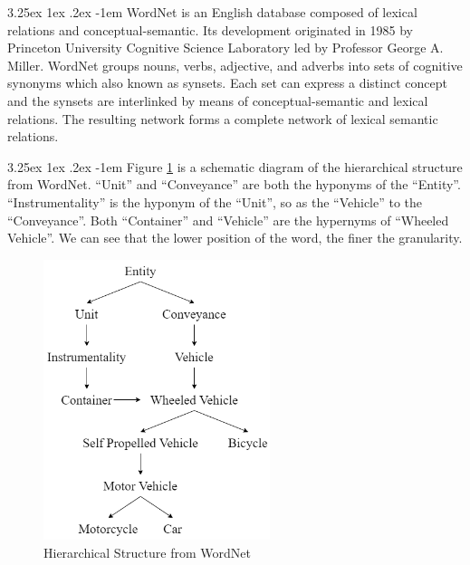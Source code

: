 \documentclass[12pt]{article}
\makeatletter
\renewcommand\paragraph{\@startsection{paragraph}{5}{\z@}%
  {3.25ex \@plus1ex \@minus.2ex}%
  {-1em}%
  {\normalfont\normalsize\bfseries}}
\makeatother
\begin{document}
\begin{CJK*}{UTF8}{bkai}
\begin{spacing}{1.77}
\paragraph{}
WordNet \cite{wordnet} is an English database composed of lexical relations and conceptual-semantic. Its development originated in 1985 by Princeton University Cognitive Science Laboratory led by Professor George A. Miller. WordNet groups nouns, verbs, adjective, and adverbs into sets of cognitive synonyms which also known as synsets. Each set can express a distinct concept and the synsets are interlinked by means of conceptual-semantic and lexical relations. The resulting network forms a complete network of lexical semantic relations.

\paragraph{}
Figure \ref{fig:wordnet} is a schematic diagram of the hierarchical structure from WordNet. ``Unit'' and ``Conveyance'' are both the hyponyms of the ``Entity''. ``Instrumentality'' is the hyponym of the ``Unit'', so as the ``Vehicle'' to the ``Conveyance''. Both ``Container'' and ``Vehicle'' are the hypernyms of ``Wheeled Vehicle''. We can see that the lower position of the word, the finer the granularity.

\begin{figure}[H]
  \centering
  \includegraphics[width=250px]{WordNet.png}
  \caption{Hierarchical Structure from WordNet}
  \label{fig:wordnet}
\end{figure}


\end{spacing}
\end{CJK*}
\end{document}
